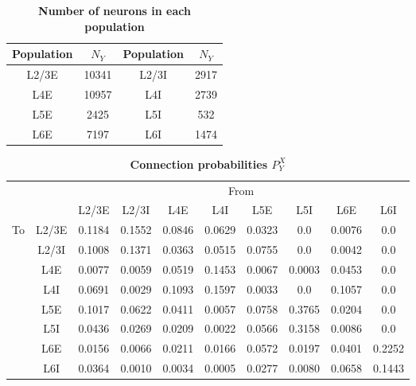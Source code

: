 \documentclass[10pt,letterpaper]{article}
\begin{document}
\begin{table}[!ht]
\centering
\caption{
{\bf Number of neurons in each population}}
\begin{tabular}[t]{cccc}
\toprule
Population & $N_{Y}$ & Population & $N_{Y}$\\
\midrule
L2/3E & 10341 & L2/3I & 2917 \\
L4E & 10957 & L4I & 2739 \\
L5E & 2425 & L5I & 532 \\
L6E & 7197 & L6I & 1474 \\
\bottomrule
\end{tabular}
\label{table1}
\end{table}

\begin{table}[!ht]
\centering
\caption{
{\bf Connection probabilities $P_{Y}^{X}$}}
\begin{tabular}[t]{cccccccccc}
\toprule
&&\multicolumn{8}{c}{From} \\
&& L2/3E & L2/3I & L4E & L4I & L5E & L5I & L6E & L6I \\
\midrule
\multirow{8}{*}{To} & \multicolumn{1}{c|}{L2/3E} & 0.1184 & 0.1552 & 0.0846 & 0.0629 & 0.0323 & 0.0 & 0.0076 & 0.0 \\ %

&\multicolumn{1}{c|}{L2/3I} & 0.1008 & 0.1371 & 0.0363 & 0.0515 & 0.0755 & 0.0 & 0.0042 & 0.0 \\ %
&\multicolumn{1}{c|}{L4E} & 0.0077 & 0.0059 & 0.0519 & 0.1453 & 0.0067 & 0.0003 & 0.0453 & 0.0 \\ %
&\multicolumn{1}{c|}{L4I} & 0.0691 & 0.0029 & 0.1093 & 0.1597 & 0.0033 & 0.0 & 0.1057 & 0.0 \\ %
&\multicolumn{1}{c|}{L5E} & 0.1017 & 0.0622 & 0.0411 & 0.0057 & 0.0758 & 0.3765 & 0.0204 & 0.0 \\ %
&\multicolumn{1}{c|}{L5I} & 0.0436 & 0.0269 & 0.0209 & 0.0022 & 0.0566 & 0.3158 & 0.0086 & 0.0 \\ %
&\multicolumn{1}{c|}{L6E} & 0.0156 & 0.0066 & 0.0211 & 0.0166 & 0.0572 & 0.0197 & 0.0401 & 0.2252 \\ %
&\multicolumn{1}{c|}{L6I} & 0.0364 & 0.0010 & 0.0034 & 0.0005 & 0.0277 & 0.0080 & 0.0658 & 0.1443 \\ %
\bottomrule
\end{tabular}
\label{table2}
\end{table}
\end{document}
